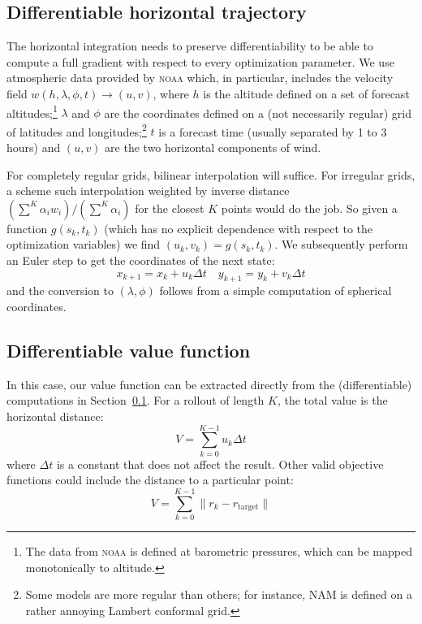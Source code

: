 \documentclass[11pt]{scrartcl} %
\begin{document}
\subsection{Differentiable horizontal trajectory} \label{sec:horizontal}
The horizontal integration needs to preserve differentiability to be able to compute a full gradient with respect to every optimization parameter. We use atmospheric data provided by \textsc{noaa} which, in particular, includes the velocity field $w(h, \lambda, \phi, t)\to(u, v)$, where $h$ is the altitude defined on a set of forecast altitudes;\footnote{The data from \textsc{noaa} is defined at barometric pressures, which can be mapped monotonically to altitude.} $\lambda$ and $\phi$ are the coordinates defined on a (not necessarily regular) grid of latitudes and longitudes;\footnote{Some models are more regular than others; for instance, NAM is defined on a rather annoying Lambert conformal grid.} $t$ is a forecast time (usually separated by 1 to 3 hours) and $(u, v)$ are the two horizontal components of wind.

For completely regular grids, bilinear interpolation will suffice. For irregular grids, a scheme such interpolation weighted by inverse distance $(\sum^K \alpha_i w_i)/(\sum^K \alpha_i)$ for the closest $K$ points would do the job. So given a function $g(s_k, t_k)$ (which has no explicit dependence with respect to the optimization variables) we find $(u_k, v_k) = g(s_k, t_k)$. We subsequently perform an Euler step to get the coordinates of the next state:
\[x_{k+1} = x_k + u_k\Delta t\quad y_{k+1} = y_k + v_k\Delta t\]
and the conversion to $(\lambda, \phi)$ follows from a simple computation of spherical coordinates.

\subsection{Differentiable value function}
In this case, our value function can be extracted directly from the (differentiable) computations in Section~\ref{sec:horizontal}. For a rollout of length $K$, the total value is the horizontal distance:
\begin{equation}
V = \sum_{k=0}^{K-1} u_k \Delta t\label{eqn:value}
\end{equation}
where $\Delta t$ is a constant that does not affect the result. Other valid objective functions could include the distance to a particular point:
\[V = \sum_{k=0}^{K-1} \lVert r_k - r_\text{target}\rVert\]
\end{document}
